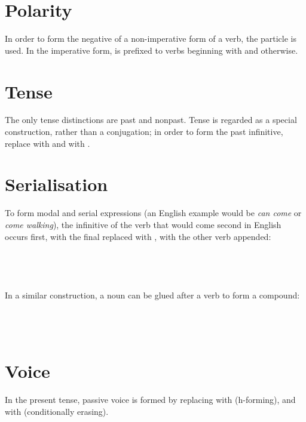 \documentclass{book}
\begin{document}
\section{Polarity}

In order to form the negative of a non-imperative form of a verb, the particle  is used. In the imperative form,  is prefixed to verbs beginning with  and  otherwise. \\

\section{Tense}

The only tense distinctions are past and nonpast. Tense is regarded as a special construction, rather than a conjugation; in order to form the past infinitive, replace  with  and  with .

\section{Serialisation}

\label{sec:serialisation}

To form modal and serial expressions (an English example would be \emph{can come} or \emph{come walking}), the infinitive of the verb that would come second in English occurs first, with the final  replaced with , with the other verb appended: \\
~\\
 \\
 \\
  \\

In a similar construction, a noun can be glued after a verb to form a compound: \\
~\\
 \\
 \\
 

\section{Voice}

In the present tense, passive voice is formed by replacing  with  (h-forming), and  with  (conditionally erasing).
\end{document}
